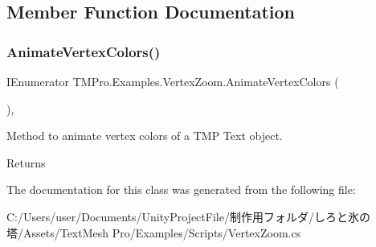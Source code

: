 \subsection{Member Function Documentation}
\mbox{\label{class_t_m_pro_1_1_examples_1_1_vertex_zoom_a0fc98ad8ed9f103145f1dfe96540e88a}} 
\subsubsection{\texorpdfstring{Animate\+Vertex\+Colors()}{AnimateVertexColors()}}
{\footnotesize\ttfamily I\+Enumerator T\+M\+Pro.\+Examples.\+Vertex\+Zoom.\+Animate\+Vertex\+Colors (\begin{DoxyParamCaption}{ }\end{DoxyParamCaption})\hspace{0.3cm}{\ttfamily [inline]}, {\ttfamily [private]}}



Method to animate vertex colors of a T\+MP Text object. 

\begin{DoxyReturn}{Returns}

\end{DoxyReturn}


The documentation for this class was generated from the following file\+:\begin{DoxyCompactItemize}
\item 
C\+:/\+Users/user/\+Documents/\+Unity\+Project\+File/制作用フォルダ/しろと氷の塔/\+Assets/\+Text\+Mesh Pro/\+Examples/\+Scripts/Vertex\+Zoom.\+cs\end{DoxyCompactItemize}

